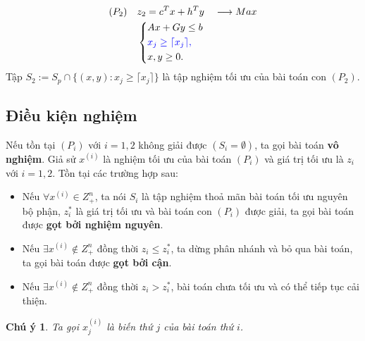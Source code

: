 \documentclass[12pt,a4paper]{report}
\newtheorem{cy}{Chú ý}
\begin{document}
\begin{equation}
    \begin{split}
    (P_2) \quad & z_2=c^Tx+h^Ty \quad \longrightarrow Max \\
                & \left\{\begin{split}
                    &Ax+Gy \leq  b \\
                    &\color{blue} x_j \geq \lceil x_j \rceil , \\
                    &x,y \geq 0.
                \end{split}\right.    
    \end{split}
\end{equation}
Tập $S_2:=S_p \cap \{ (x,y): x_j \geq \lceil x_j \rceil \}$ là tập nghiệm tối ưu của bài toán con $(P_2)$.

\subsection*{Điều kiện nghiệm}
Nếu tồn tại $(P_i)$ với $i=1,2$ không giải được $(S_i = \emptyset )$, ta gọi bài toán \textbf{vô nghiệm}. Giả sử $x^{(i)}$ là nghiệm tối ưu của bài toán $(P_i)$ và giá trị tối ưu là $z_i$ với $i = 1,2$. Tồn tại các trường hợp sau:
\begin{itemize}
\item Nếu $\forall x^{(i)} \in Z^n_+$, ta nói $S_i$ là tập nghiệm thoả mãn bài toán tối ưu nguyên bộ phận, $z^*_i$ là giá trị tối ưu và bài toán con $(P_i)$ được giải, ta gọi bài toán được \textbf{gọt bởi nghiệm nguyên}.
\item Nếu $\exists x^{(i)} \notin Z^n_+$ đồng thời $z_i \leq z^*_i$, ta dừng phân nhánh và bỏ qua bài toán, ta gọi bài toán được \textbf{gọt bởi cận}.
\item Nếu $\exists x^{(i)} \notin Z^n_+$ đồng thời $z_i > z^*_i$, bài toán chưa tối ưu và có thể tiếp tục cải thiện.

\end{itemize}

\begin{cy}
Ta gọi $x_j^{(i)}$ là biến thứ $j$ của bài toán thứ $i$.
\end{cy}
\end{document}
